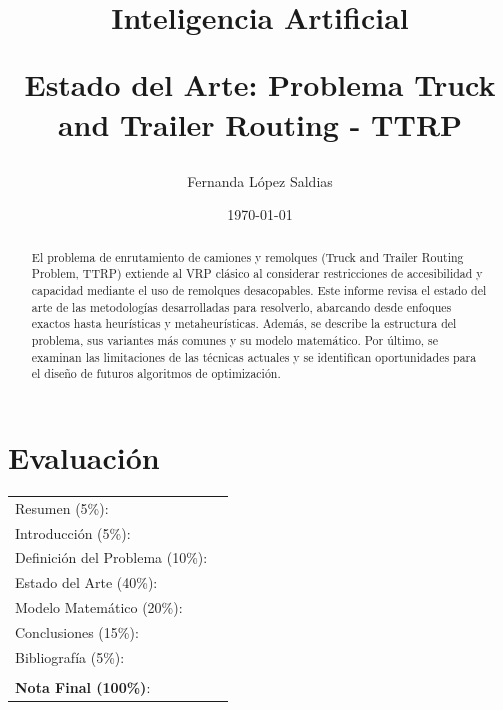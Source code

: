 \documentclass[letter, 10pt]{article}
\begin{document}
\title{Inteligencia Artificial \\ \begin{Large}Estado del Arte: Problema Truck and Trailer Routing - TTRP\end{Large}}
\author{Fernanda L\'opez Saldias}
\date{\today}
\maketitle


\section*{Evaluaci\'on}

\begin{tabular}{ll}
Resumen (5\%): & \underline{\hspace{2cm}} \\
Introducci\'on (5\%):  & \underline{\hspace{2cm}} \\
Definici\'on del Problema (10\%):  & \underline{\hspace{2cm}} \\
Estado del Arte (40\%):  & \underline{\hspace{2cm}} \\
Modelo Matem\'atico (20\%): &  \underline{\hspace{2cm}}\\
Conclusiones (15\%): &  \underline{\hspace{2cm}}\\
Bibliograf\'ia (5\%): & \underline{\hspace{2cm}}\\
 &  \\
\textbf{Nota Final (100\%)}:   & \underline{\hspace{2cm}}
\end{tabular}
\vspace{2cm}


\begin{abstract}
El problema de enrutamiento de camiones y remolques (Truck and Trailer Routing Problem, TTRP) extiende al VRP cl\'asico al considerar restricciones de accesibilidad y capacidad mediante el uso de remolques desacopables.
Este informe revisa el estado del arte de las metodolog\'ias desarrolladas para resolverlo, abarcando desde enfoques exactos hasta heur\'isticas y metaheur\'isticas.
Adem\'as, se describe la estructura del problema, sus variantes m\'as comunes y su modelo matem\'atico. 
Por \'ultimo, se examinan las limitaciones de las t\'ecnicas actuales y se identifican oportunidades para el dise\~no de futuros algoritmos de optimizaci\'on.
\end{abstract}
\end{document}
